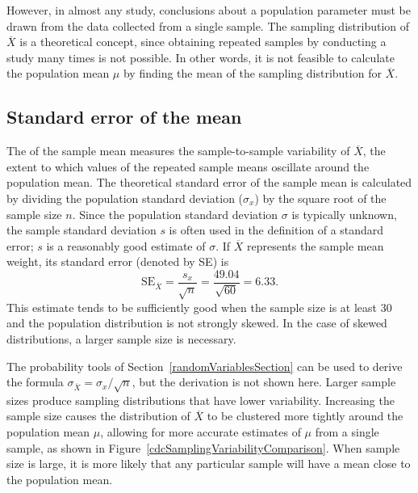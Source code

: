 However, in almost any study, conclusions about a population parameter must be drawn from the data collected from a single sample. The sampling distribution of $\overline{X}$ is a theoretical concept, since obtaining repeated samples by conducting a study many times is not possible. In other words, it is not feasible to calculate the population mean $\mu$ by finding the mean of the sampling distribution for $\overline{X}$.

\subsection{Standard error of the mean}
\label{seOfTheMean}

The  of the sample mean measures the sample-to-sample variability of $\overline{X}$, the extent to which values of the repeated sample means oscillate around the population mean. The theoretical standard error of the sample mean is calculated by dividing the population standard deviation ($\sigma_{x}$) by the square root of the sample size $n$. Since the population standard deviation $\sigma$ is typically unknown, the sample standard deviation $s$ is often used in the definition of a standard error; $s$ is a reasonably good estimate of $\sigma$. If $\overline{X}$ represents the sample mean weight, its standard error (denoted by SE) is
\[\text{SE}_{\overline{X}} = \dfrac{s_{x}}{\sqrt{n}} = \dfrac{49.04}{\sqrt{60}} = 6.33. \]
This estimate tends to be sufficiently good when the sample size is at least 30 and the population distribution is not strongly skewed. In the case of skewed distributions, a larger sample size is necessary.


The probability tools of Section~\ref{randomVariablesSection} can be used to derive the formula $\sigma_{\overline{X}} = \sigma_x/\sqrt{n}$, but the derivation is not shown here. Larger sample sizes produce sampling distributions that have lower variability. Increasing the sample size causes the distribution of $\overline{X}$ to be clustered more tightly around the population mean $\mu$, allowing for more accurate estimates of $\mu$ from a single sample, as shown in Figure~\ref{cdcSamplingVariabilityComparison}. When sample size is large, it is more likely that any particular sample will have a mean close to the population mean. 

